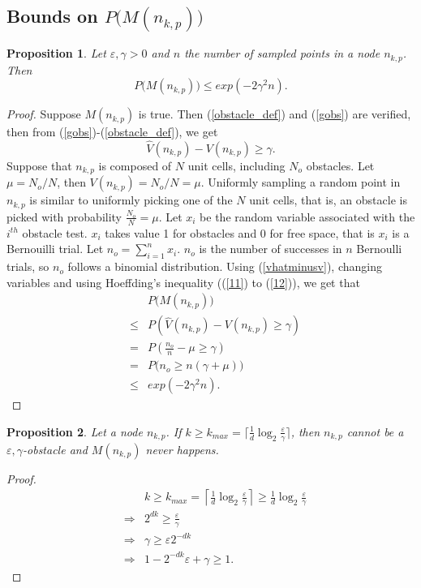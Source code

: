 \documentclass[letterpaper, 10 pt, conference]{ieeeconf}
\newtheorem{prop}{Proposition}
\theoremstyle{definition}
\begin{document}
\subsection{Bounds on $P \big(M(n_{k,p})\big)$}
\begin{prop}
Let $\varepsilon,\gamma>0$ and $n$ the number of sampled points in a node $n_{k,p}$. Then
\begin{equation}
P \big(M(n_{k,p})\big) \leq exp\left(-2\gamma^2 n\right).
\end{equation}
\end{prop}
\begin{proof}
Suppose $M(n_{k,p})$ is true. Then (\ref{obstacle_def}) and (\ref{gobs}) are verified, then from (\ref{gobs})-(\ref{obstacle_def}), we get  
\begin{equation}
\label{vhatminusv}
\hat{V}(n_{k,p})-V(n_{k,p}) \geq \gamma.
\end{equation}
Suppose that $n_{k,p}$ is composed of $N$ unit cells, including $N_o$ obstacles. Let $\mu=N_o/N$, then 
$V(n_{k,p}) = N_o/N =\mu$.
Uniformly sampling a random point in $n_{k,p}$ is similar to uniformly picking one of the $N$ unit cells, that is, an obstacle is picked with probability $\frac{N_o}{N} =\mu$. Let $x_i$ be the random variable associated with the $i^{th}$ obstacle test. $x_i$ takes value 1 for obstacles and 0 for free space, that is $x_i$ is a Bernouilli trial. Let $n_o=\sum_{i=1}^n x_i$. $n_o$ is the number of successes in $n$ Bernoulli trials, so $n_o$ follows a binomial distribution. Using (\ref{vhatminusv}), changing variables and using Hoeffding's inequality ((\ref{11}) to (\ref{12})), we get that
\begin{eqnarray}
&& P \big(M(n_{k,p})\big) \\
&\leq & P \left(\hat{V}(n_{k,p})-V(n_{k,p}) \geq \gamma \right)\\
 &=& P\left( \frac{n_o}{n} - \mu \geq \gamma \right) \\
\label{11} &=& P \big( n_o \geq n(\gamma+\mu) \big) \\
\label{12} &\leq& exp\left(-2\gamma^2 n \right).
\end{eqnarray}
\end{proof}
\begin{prop}
Let a node $n_{k,p}$.
If $k \geq k_{max} =\lceil \frac{1}{d}\log_2 \frac{\varepsilon}{\gamma} \rceil$, then $n_{k,p}$ cannot be a $\varepsilon,\gamma$-obstacle and $M(n_{k,p})$ never happens.
\end{prop}
\begin{proof}
\begin{eqnarray}
&& k \geq k_{max} =\left \lceil \frac{1}{d}\log_2 \frac{\varepsilon}{\gamma} \right\rceil \geq \frac{1}{d}\log_2 \frac{\varepsilon}{\gamma} \\
&\Rightarrow& 2^{dk} \geq \frac{\varepsilon}{\gamma}\\
&\Rightarrow& \gamma \geq \varepsilon 2^{-dk}\\
&\Rightarrow& 1-2^{-d k}\varepsilon + \gamma \geq 1.
\end{eqnarray}
\end{proof}
\end{document}

